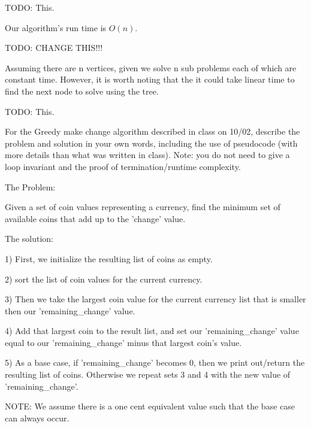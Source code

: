 \documentclass{article}
\begin{document}

TODO: This.


Our algorithm's run time is $O(n)$. 

TODO: CHANGE THIS!!!

Assuming there are n vertices, given we solve n sub problems each of which are constant time. However, it is worth noting that the it could take linear time to find the next node to solve using the tree.


TODO: This.

\nextprob
For the Greedy make change algorithm described in class on 10/02, describe the
problem and solution in your own words, including the use of pseudocode (with
more details than what was written in class).  Note: you do not need to give a
loop invariant and the proof of termination/runtime complexity.

The Problem:

Given a set of coin values representing a currency, find the minimum set of available coins that add up to the 'change' value.

The solution:

1) First, we initialize the resulting list of coins as empty.

2) sort the list of coin values for the current currency.

3) Then we take the largest coin value for the current currency list that is smaller then our 'remaining\_change' value.

4) Add that largest coin to the result list, and set our 'remaining\_change' value equal to our 'remaining\_change' minus that largest coin's value.

5) As a base case, if 'remaining\_change' becomes 0, then we print out/return the resulting list of coins. Otherwise we repeat sets 3 and 4 with the new value of 'remaining\_change'. 

NOTE: We assume there is a one cent equivalent value such that the base case can always occur.
\end{document}
